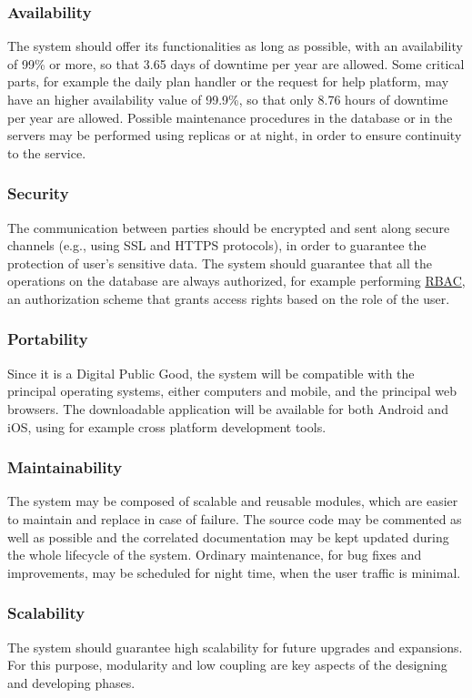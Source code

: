 \subsubsection{Availability}
The system should offer its functionalities as long as possible, with an availability of 99\% or more, so that 3.65 days of downtime per year are allowed. Some critical parts, for example the daily plan handler or the request for help platform, may have an higher availability value of 99.9\%, so that only 8.76 hours of downtime per year are allowed. 
\newline
Possible maintenance procedures in the database or in the servers may be performed using replicas or at night, in order to ensure continuity to the service.
\subsubsection{Security}
The communication between parties should be encrypted and sent along secure channels (e.g., using SSL and HTTPS protocols), in order to guarantee the protection of user’s sensitive data. 
\newline
The system should guarantee that all the operations on the database are always authorized, for example performing \hyperref[tab:acronymsTable]{RBAC}, an authorization scheme that grants access rights based on the role of the user.
\subsubsection{Portability}
Since it is a Digital Public Good, the system will be compatible with the principal operating systems, either computers and mobile, and the principal web browsers. The downloadable application will be available for both Android and iOS, using for example cross platform development tools.
\subsubsection{Maintainability}
The system may be composed of scalable and reusable modules, which are easier to maintain and replace in case of failure. The source code may be commented as well as possible and the correlated documentation may be kept updated during the whole lifecycle of the system. Ordinary maintenance, for bug fixes and improvements, may be scheduled for night time, when the user traffic is minimal.
\subsubsection{Scalability}
The system should guarantee high scalability for future upgrades and expansions. For this purpose, modularity and low coupling are key aspects of the designing and developing phases.
